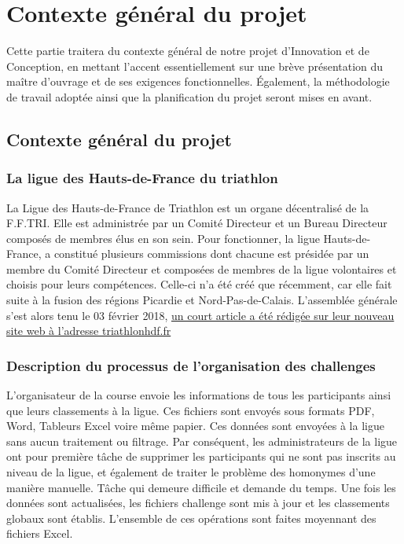 	\chapter{Contexte général du projet}
	
	Cette partie traitera du contexte général de notre projet d’Innovation et de Conception, en mettant l’accent essentiellement sur une brève présentation du maître d'ouvrage et de ses exigences fonctionnelles. Également, la méthodologie de travail adoptée ainsi que la planification du projet seront mises en avant.  
	
	\newpage
	\section {Contexte général du projet}
	\subsection{La ligue des Hauts-de-France du triathlon }
	
	La Ligue des Hauts-de-France de Triathlon est un organe décentralisé de la F.F.TRI. Elle est administrée par un Comité Directeur et un Bureau Directeur composés de membres élus en son sein. 
	Pour fonctionner, la ligue Hauts-de-France, a constitué plusieurs commissions dont chacune est présidée par un membre du Comité Directeur et composées de membres de la ligue volontaires et choisis pour leurs compétences.
	Celle-ci n'a été créé que récemment, car elle fait suite à la fusion des régions Picardie et Nord-Pas-de-Calais.
	L'assemblée générale s'est alors tenu le 03 février 2018, \href{http://triathlonhdf.fr/samedi-03-fevrier-2018-la-ligue-des-hauts-de-france-de-triathlon-est-creee/}{un court article a été rédigée sur leur nouveau site web à l'adresse triathlonhdf.fr} \cite{ref1}
	
	\subsection{Description du processus de l’organisation des challenges }
	L’organisateur de la course envoie les informations de tous les participants ainsi que leurs classements à la ligue. Ces fichiers sont envoyés sous formats PDF, Word, Tableurs Excel voire même papier.  Ces données sont envoyées à la ligue sans aucun traitement ou filtrage. Par conséquent, les administrateurs de la ligue ont pour première tâche de supprimer les participants qui ne sont pas inscrits au niveau de la ligue, et également de traiter le problème des homonymes d’une manière manuelle. Tâche qui demeure difficile et demande du temps.
	Une fois les données sont actualisées, les fichiers challenge sont mis à jour et les classements globaux sont établis. L’ensemble de ces opérations sont faites moyennant des fichiers Excel.
	
